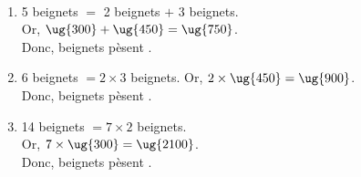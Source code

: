    \ \\ [-5mm]\begin{enumerate}
      \item 5 beignets $=$ 2 beignets $+$ 3 beignets. \\
         Or, $\ug{300}+\ug{450} =\ug{750}$. \\
         Donc, { beignets pèsent }.
      \item 6 beignets $=2\times3$ beignets.
         Or, $2\times\ug{450} = \ug{900}$. \\
         Donc, { beignets pèsent }.
      \item 14 beignets $=7\times2$ beignets. \\
         Or, $7\times\ug{300} =\ug{2100}$. \\
         Donc, { beignets pèsent }.
   \end{enumerate}
